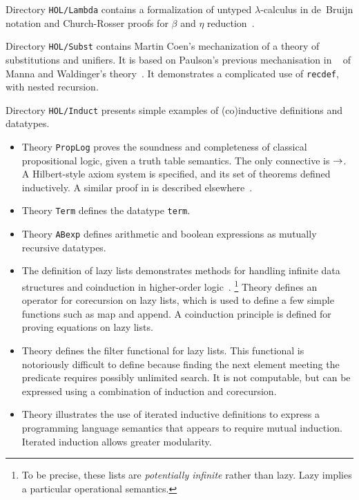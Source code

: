 Directory \texttt{HOL/Lambda} contains a formalization of untyped
$\lambda$-calculus in de~Bruijn notation and Church-Rosser proofs for $\beta$
and $\eta$ reduction~\cite{Nipkow-CR}.

Directory \texttt{HOL/Subst} contains Martin Coen's mechanization of a theory of
substitutions and unifiers.  It is based on Paulson's previous
mechanisation in {\LCF}~\cite{paulson85} of Manna and Waldinger's
theory~\cite{mw81}.  It demonstrates a complicated use of \texttt{recdef},
with nested recursion.

Directory \texttt{HOL/Induct} presents simple examples of (co)inductive
definitions and datatypes.
\begin{itemize}
\item Theory \texttt{PropLog} proves the soundness and completeness of
  classical propositional logic, given a truth table semantics.  The only
  connective is $\rightarrow$.  A Hilbert-style axiom system is specified, and its
  set of theorems defined inductively.  A similar proof in \ZF{} is
  described elsewhere~\cite{paulson-set-II}.

\item Theory \texttt{Term} defines the datatype \texttt{term}.

\item Theory \texttt{ABexp} defines arithmetic and boolean expressions
 as mutually recursive datatypes.

\item The definition of lazy lists demonstrates methods for handling
  infinite data structures and coinduction in higher-order
  logic~\cite{paulson-coind}.%
\footnote{To be precise, these lists are \emph{potentially infinite} rather
  than lazy.  Lazy implies a particular operational semantics.}
  Theory  defines an operator for
  corecursion on lazy lists, which is used to define a few simple functions
  such as map and append.   A coinduction principle is defined
  for proving equations on lazy lists.
  
\item Theory  defines the filter functional for lazy lists.
  This functional is notoriously difficult to define because finding the next
  element meeting the predicate requires possibly unlimited search.  It is not
  computable, but can be expressed using a combination of induction and
  corecursion.  

\item Theory  illustrates the use of iterated inductive definitions
  to express a programming language semantics that appears to require mutual
  induction.  Iterated induction allows greater modularity.
\end{itemize}

